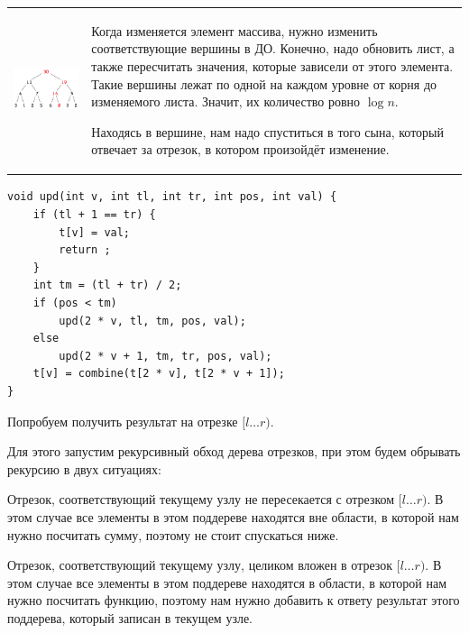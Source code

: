
\down
\begin{tabular}{cm{}}
	\begin{minipage}{4cm}	
		\includegraphics[scale=0.5]{files/set_example.png}
	\end{minipage}
	&
	Когда изменяется элемент массива, нужно изменить соответствующие вершины в ДО. Конечно, надо обновить лист, а также пересчитать значения, которые зависели от этого элемента. Такие вершины лежат по одной на каждом уровне от корня до изменяемого листа. Значит, их количество ровно $\log n$.
	
	Находясь в вершине, нам надо спуститься в того сына, который отвечает за отрезок, в котором произойдёт изменение.
\end{tabular}
\down
\up \up
\begin{verbatim}
void upd(int v, int tl, int tr, int pos, int val) {
	if (tl + 1 == tr) {
		t[v] = val;
		return ;
	}
	int tm = (tl + tr) / 2;
	if (pos < tm)
	    upd(2 * v, tl, tm, pos, val);
	else
	    upd(2 * v + 1, tm, tr, pos, val);
	t[v] = combine(t[2 * v], t[2 * v + 1]);
}
\end{verbatim}

\pagebreak


Попробуем получить результат на отрезке $[l \ldots r)$.

Для этого запустим рекурсивный обход дерева отрезков, при этом будем обрывать рекурсию в двух ситуациях:

\begin{MyList}[0pt]
	\item Отрезок, соответствующий текущему узлу не пересекается с отрезком $[l \ldots r)$. В этом случае все элементы в этом поддереве находятся вне области, в которой нам нужно посчитать сумму, поэтому не стоит спускаться ниже.
	\down
	\item Отрезок, соответствующий текущему узлу, целиком вложен в отрезок $[l \ldots r)$. В этом случае все элементы в этом поддереве находятся в области, в которой нам нужно посчитать функцию, поэтому нам нужно добавить к ответу результат этого поддерева, который записан в текущем узле.
\end{MyList}

